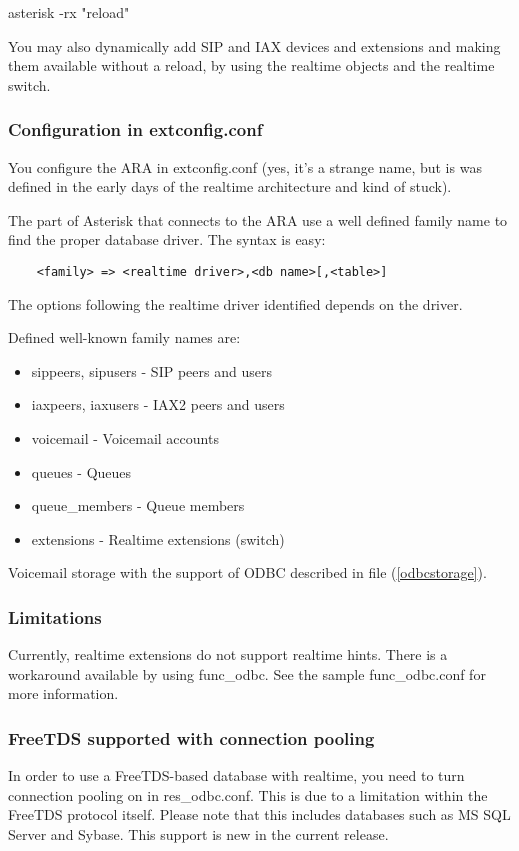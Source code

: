   asterisk -rx "reload"

You may also dynamically add SIP and IAX devices and extensions
and making them available without a reload, by using the realtime
objects and the realtime switch.

\subsubsection{Configuration in extconfig.conf}

You configure the ARA in extconfig.conf (yes, it's a strange name, but
is was defined in the early days of the realtime architecture and kind
of stuck).

The part of Asterisk that connects to the ARA use a well defined family
name to find the proper database driver. The syntax is easy:

\begin{verbatim}
    <family> => <realtime driver>,<db name>[,<table>]
\end{verbatim}

The options following the realtime driver identified depends on the
driver.

Defined well-known family names are:

\begin{itemize}
  \item sippeers, sipusers - SIP peers and users
  \item iaxpeers, iaxusers - IAX2 peers and users
  \item voicemail - Voicemail accounts
  \item queues - Queues
  \item queue\_members - Queue members
  \item extensions - Realtime extensions (switch)
\end{itemize}

Voicemail storage with the support of ODBC described in file
 (\ref{odbcstorage}).

\subsubsection{Limitations}

Currently, realtime extensions do not support realtime hints.  There is
a workaround available by using func\_odbc.  See the sample func\_odbc.conf
for more information.

\subsubsection{FreeTDS supported with connection pooling}

In order to use a FreeTDS-based database with realtime, you need to turn
connection pooling on in res\_odbc.conf.  This is due to a limitation within
the FreeTDS protocol itself.  Please note that this includes databases such
as MS SQL Server and Sybase.  This support is new in the current release.
